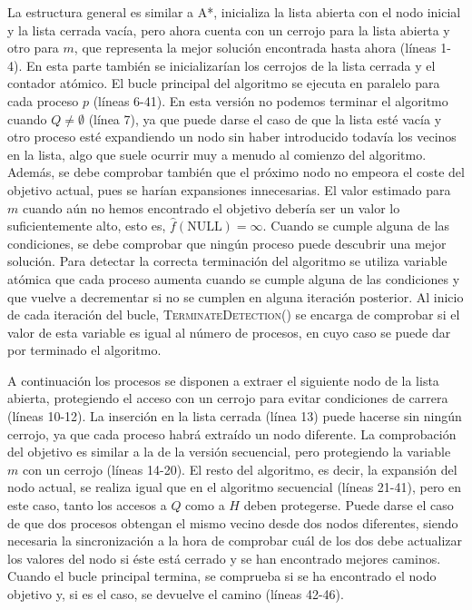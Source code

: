 \documentclass[a4paper,12pt]{article}
\begin{document}
La estructura general es similar a A*, inicializa la lista abierta con el nodo inicial y la lista cerrada vacía, pero ahora cuenta con un cerrojo para la lista abierta y otro para $m$, que representa la mejor solución encontrada hasta ahora (líneas 1-4). En esta parte también se inicializarían los cerrojos de la lista cerrada y el contador atómico. El bucle principal del algoritmo se ejecuta en paralelo para cada proceso $p$ (líneas 6-41). En esta versión no podemos terminar el algoritmo cuando $Q\neq \emptyset$ (línea 7), ya que puede darse el caso de que la lista esté vacía y otro proceso esté expandiendo un nodo sin haber introducido todavía los vecinos en la lista, algo que suele ocurrir muy a menudo al comienzo del algoritmo. Además, se debe comprobar también que el próximo nodo no empeora el coste del objetivo actual, pues se harían expansiones innecesarias. El valor estimado para $m$ cuando aún no hemos encontrado el objetivo debería ser un valor lo suficientemente alto, esto es, $\hat{f}(\text{NULL})=\infty$. Cuando se cumple alguna de las condiciones, se debe comprobar que ningún proceso puede descubrir una mejor solución. Para detectar la correcta terminación del algoritmo se utiliza variable atómica que cada proceso aumenta cuando se cumple alguna de las condiciones y que vuelve a decrementar si no se cumplen en alguna iteración posterior. Al inicio de cada iteración del bucle, \textsc{TerminateDetection()} se encarga de comprobar si el valor de esta variable es igual al número de procesos, en cuyo caso se puede dar por terminado el algoritmo. 

A continuación los procesos se disponen a extraer el siguiente nodo de la lista abierta, protegiendo el acceso con un cerrojo para evitar condiciones de carrera (líneas 10-12). La inserción en la lista cerrada (línea 13) puede hacerse sin ningún cerrojo, ya que cada proceso habrá extraído un nodo diferente. La comprobación del objetivo es similar a la de la versión secuencial, pero protegiendo la variable $m$ con un cerrojo (líneas 14-20). El resto del algoritmo, es decir, la expansión del nodo actual, se realiza igual que en el algoritmo secuencial (líneas 21-41), pero en este caso, tanto los accesos a $Q$ como a $H$ deben protegerse. Puede darse el caso de que dos procesos obtengan el mismo vecino desde dos nodos diferentes, siendo necesaria la sincronización a la hora de comprobar cuál de los dos debe actualizar los valores del nodo si éste está cerrado y se han encontrado mejores caminos. Cuando el bucle principal termina, se comprueba si se ha encontrado el nodo objetivo y, si es el caso, se devuelve el camino (líneas 42-46).
\end{document}
